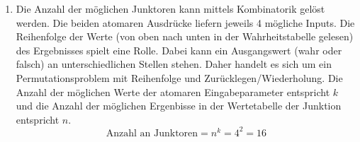 \documentclass[a4paper]{article}
\begin{document}
\begin{enumerate}
\begin{enumerate}
			\item
			Die Anzahl der möglichen Junktoren kann mittels Kombinatorik gelöst werden. Die beiden atomaren Ausdrücke liefern jeweils 4 mögliche Inputs. Die Reihenfolge der Werte (von oben nach unten in der Wahrheitstabelle gelesen) des Ergebnisses spielt eine Rolle. Dabei kann ein Ausgangswert (wahr oder falsch) an unterschiedlichen Stellen stehen. Daher handelt es sich um ein Permutationsproblem mit Reihenfolge und Zurücklegen/Wiederholung. Die Anzahl der möglichen Werte der atomaren Eingabeparameter entspricht $k$ und die Anzahl der möglichen Ergenbisse in der Wertetabelle der Junktion entspricht $n$.
			\begin{equation*}
				\text{Anzahl an Junktoren} = n^k = 4^2 = 16
			\end{equation*}				
		\end{enumerate}
	\end{enumerate}
\end{document}
